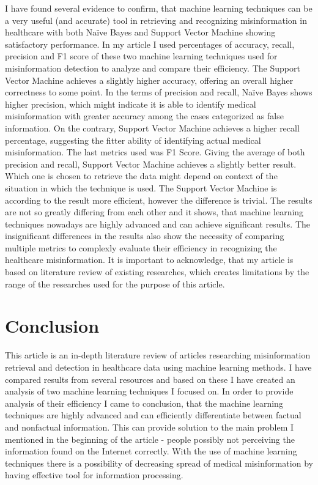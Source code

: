 \documentclass[11pt ,english,a4paper]{article}
\begin{document}
I have found several evidence to confirm, that machine learning techniques can be a very useful (and accurate) tool in retrieving and recognizing misinformation in healthcare with both Naïve Bayes and Support Vector Machine showing satisfactory performance. In my article I used percentages of accuracy, recall, precision and F1 score of these two machine learning techniques used for misinformation detection to analyze and compare their efficiency. 
The Support Vector Machine achieves a slightly higher accuracy, offering an overall higher correctness to some point. In the terms of precision and recall, Naïve Bayes shows higher precision, which might indicate it is able to identify medical misinformation with greater accuracy among the cases categorized as false information. On the contrary, Support Vector Machine achieves a higher recall percentage, suggesting the fitter ability of identifying actual medical misinformation. The last metrics used was F1 Score. Giving the average of both precision and recall, Support Vector Machine achieves a slightly better result.
Which one is chosen to retrieve the data might depend on context of the situation in which the technique is used. The Support Vector Machine is according to the result more efficient, however the difference is trivial. The results are not so greatly differing from each other and it shows, that machine learning techniques nowadays are highly advanced and can achieve significant results. The insignificant differences in the results also show the necessity of comparing multiple metrics to complexly evaluate their efficiency in recognizing the healthcare misinformation.
It is important to acknowledge, that my article is based on literature review of existing researches, which creates limitations by the range of the researches used for the purpose of this article.

\section{Conclusion}\label{conclusion}

This article is an in-depth literature review of articles researching misinformation retrieval and detection in healthcare data using machine learning methods. I have compared results from several resources and based on these I have created an analysis of two machine learning techniques I focused on. In order to provide analysis of their efficiency I came to conclusion, that the machine learning techniques are highly advanced and can efficiently differentiate between factual and nonfactual information. This can provide solution to the main problem I mentioned in the beginning of the article - people possibly not perceiving the information found on the Internet correctly. With the use of machine learning techniques there is a possibility of decreasing spread of medical misinformation by having effective tool for information processing.
\end{document}
